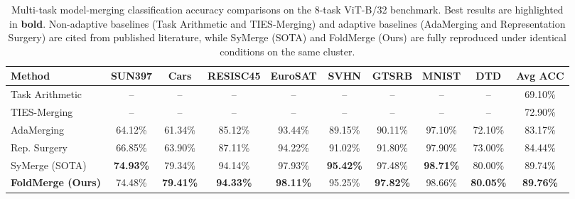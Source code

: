 \begin{table}[t]
\caption{Multi-task model-merging classification accuracy comparisons on the 8-task ViT-B/32 benchmark. Best results are highlighted in \textbf{bold}. Non-adaptive baselines (Task Arithmetic and TIES-Merging) and adaptive baselines (AdaMerging and Representation Surgery) are cited from published literature, while SyMerge (SOTA) and FoldMerge (Ours) are fully reproduced under identical conditions on the same cluster.}
\label{tab:main_results}
\vskip 0.15in
\begin{center}
\begin{small}
\begin{sc}
\setlength{\tabcolsep}{5.5pt}
\begin{tabular}{lccccccccc}
\toprule
Method & SUN397 & Cars & RESISC45 & EuroSAT & SVHN & GTSRB & MNIST & DTD & Avg ACC \\
\midrule
Task Arithmetic & -- & -- & -- & -- & -- & -- & -- & -- & 69.10\% \\
TIES-Merging & -- & -- & -- & -- & -- & -- & -- & -- & 72.90\% \\
AdaMerging & 64.12\% & 61.34\% & 85.12\% & 93.44\% & 89.15\% & 90.11\% & 97.10\% & 72.10\% & 83.17\% \\
Rep. Surgery & 66.85\% & 63.90\% & 87.11\% & 94.22\% & 91.02\% & 91.80\% & 97.90\% & 73.00\% & 84.44\% \\
SyMerge (SOTA) & \textbf{74.93\%} & 79.34\% & 94.14\% & 97.93\% & \textbf{95.42\%} & 97.48\% & \textbf{98.71\%} & 80.00\% & 89.74\% \\
\midrule
\textbf{FoldMerge (Ours)} & 74.48\% & \textbf{79.41\%} & \textbf{94.33\%} & \textbf{98.11\%} & 95.25\% & \textbf{97.82\%} & 98.66\% & \textbf{80.05\%} & \textbf{89.76\%} \\
\bottomrule
\end{tabular}
\end{sc}
\end{small}
\end{center}
\vskip -0.1in
\end{table}

